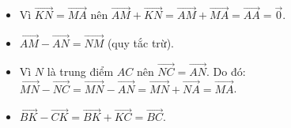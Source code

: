 \begin{vd}
{\begin{enumerate}
\begin{itemize}
				\item Vì $\overrightarrow{KN} = \overrightarrow{MA}$ nên $\overrightarrow{AM} + \overrightarrow{KN} = \overrightarrow{AM} + \overrightarrow{MA} = \overrightarrow{AA} = \vec{0}$.
				\item $\overrightarrow{AM} - \overrightarrow{AN} = \overrightarrow{NM}$ (quy tắc trừ).
				\item Vì $N$ là trung điểm $AC$ nên $\overrightarrow{NC} = \overrightarrow{AN}$. Do đó: $\overrightarrow{MN} - \overrightarrow{NC} = \overrightarrow{MN} - \overrightarrow{AN} = \overrightarrow{MN} + \overrightarrow{NA} = \overrightarrow{MA}$.
				\item $\overrightarrow{BK} - \overrightarrow{CK} = \overrightarrow{BK} + \overrightarrow{KC} = \overrightarrow{BC}$.
			\end{itemize}
		\end{enumerate}
	}
\end{vd} 


